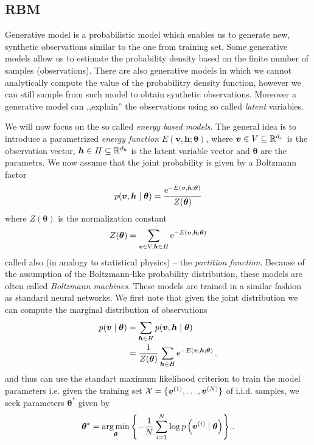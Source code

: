 \documentclass{myclass}
\begin{document}
\subsection{RBM}

Generative model is a probabilistic model which enables us to generate new, synthetic observations
similar to the one from training set. Some generative models allow us to estimate the probability
density based on the finite number of samples (observations). There are also generative models in
which we cannot analytically compute the value of the probabilitry density function, however we can
still sample from such model to obtain synthetic observations. Moreover a generative model can
,,explain'' the observations using so called \emph{latent} variables.

We will now focus on the so called \emph{energy based models}. The general idea is to introduce a
parametrized \emph{energy function} \(E(\bm{v},\bm{h}; \bm{\theta})\), where \(\bm{v} \in V
\subseteq \mathbb{R}^{d_v}\) is the observation vector, \(\bm{h} \in H \subseteq \mathbb{R}^{d_h}\) is the
latent variable vector and \(\bm{\theta}\) are the parametrs. We now assume that the joint
probability is given by a Boltzmann factor
\[
   p(\bm{v},\bm{h} \mid \bm{\theta}) = \frac{\mathrm{e}^{- E( \bm{v}, \bm{h}; \bm{\theta})}}{Z(\bm{\theta})}
\]
where \(Z(\bm{\theta})\) is the normalization constant
\[
   Z(\bm{\theta}) = \sum_{\bm{v} \in V, \bm{h} \in H} \mathrm{e}^{-E(\bm{v},\bm{h}; \bm{\theta})}
\]
called also (in analogy to statistical physics) -- the \emph{partition function}. Because of the
assumption of the Boltzmann-like probability distribution, these models are often called
\emph{Boltzmann machines}. These models are trained in a similar fashion as standard neural
networks. We first note that given the joint distribution we can compute the marginal distribution
of observations
\[
\begin{split}
   p(\bm{v} \mid \bm{\theta}) &= \sum_{\bm{h} \in H} p(\bm{v},\bm{h} \mid \bm{\theta}) \\
                              &= \frac{1}{Z(\bm{\theta})} \sum_{\bm{h} \in H} \mathrm{e}^{-E(\bm{v},\bm{h}; \bm{\theta})}\,.
\end{split}
\]
and thus can use the standart maximum likelihood criterion to train the model parameters i.e. given
the training set \(\mathcal{X} = \{\bm{v}^{(1)}, \ldots, \bm{v}^{(N)}\}\) of i.i.d. samples, we seek
parameters \(\bm{\theta}^*\) given by
\[
   \bm{\theta}^* = \operatorname*{arg\,min}_{\bm{\theta}} \left\{ -\frac{1}{N} \sum_{i=1}^N \log p\left(\bm{v}^{(i)} \mid \bm{\theta}\right) \right\}\,.
\]
\end{document}
